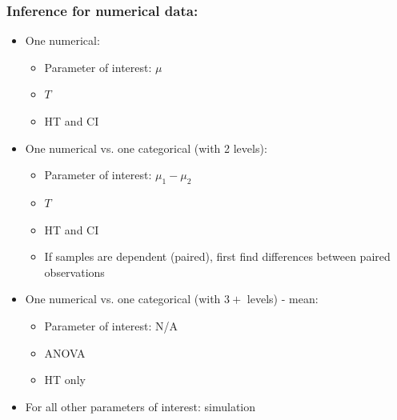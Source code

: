 \documentclass[slidestop,compress,mathserif,12pt,t,professionalfonts,xcolor=table]{beamer}
\begin{document}
\begin{frame}
\frametitle{Inference for numerical data:}

\pause

\begin{itemize}

\item One numerical: \\
\begin{itemize}
\item Parameter of interest: $\mu$
\item $T$
\item HT and CI
\end{itemize}

\pause

\item One numerical vs. one categorical (with 2 levels):
\begin{itemize}
\item Parameter of interest: $\mu_1 - \mu_2$
\item $T$
\item HT and CI
\pause
\item If samples are dependent (paired), first find differences between paired observations
\end{itemize}

\pause

\item One numerical vs. one categorical (with $3+$ levels) - mean: \\
\begin{itemize}
\item Parameter of interest: N/A
\item ANOVA
\item HT only
\end{itemize}

\pause

\item For all other parameters of interest: simulation

\end{itemize}

\end{frame}

\end{document}
